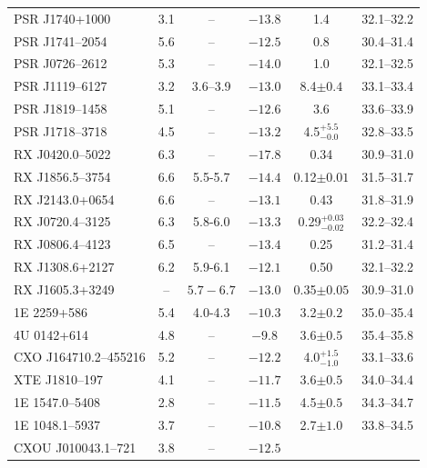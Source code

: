 \documentclass[smallextended]{svjour3}       %
\begin{document}
\begin{table}
\begin{center}
\begin{tabular}{l c c c c c }
        PSR J1740+1000       &  3.1  & -- & $ -13.8$ &      
            1.4 &   32.1--32.2 \\
        PSR J1741--2054        & 5.6 & -- & $-12.5$ &   0.8 &
30.4--31.4 \\
        PSR J0726--2612       &  5.3  & -- & $-14.0$ &       
           1.0 &     32.1--32.5 \\
        PSR J1119--6127       &  3.2 & 3.6--3.9 & $-13.0$ &  
       8.4$\pm 0.4$ &    33.1--33.4 \\
        PSR J1819--1458       &  5.1 & -- & $-12.6$ &        
          3.6 &    33.6--33.9 \\
        PSR J1718--3718       & 4.5 & -- & $ -13.2$ & 4.5$^{+
5.5}_{- 0.0}$ &    32.8--33.5 \\
       RX J0420.0--5022        & 6.3 & -- & $ -17.8$ &       
          0.34 &    30.9--31.0 \\
       RX J1856.5--3754       & 6.6 & 5.5-5.7 & $ -14.4$ &   
     0.12$\pm0.01$ &    31.5--31.7 \\
       RX J2143.0+0654      &  6.6 & -- & $-13.1$ &         
        0.43 &    31.8--31.9 \\
       RX J0720.4--3125       & 6.3 & 5.8-6.0 & $ -13.3$
&0.29$^{+0.03}_{-0.02}$ &    32.2--32.4 \\
       RX J0806.4--4123       & 6.5 & -- & $ -13.4$ &        
         0.25 &  31.2--31.4 \\
       RX J1308.6+2127      & 6.2 & 5.9-6.1 & $ -12.1$ &    
             0.50 &   32.1--32.2 \\
       RX J1605.3+3249      &  -- & $ 5.7-6.7 $ & $-13.0$ & 
      0.35$\pm 0.05$ &   30.9--31.0 \\
           1E 2259+586         & 5.4 & 4.0-4.3 & $ -10.3$ & 
        3.2$\pm 0.2$ &    35.0--35.4 \\
           4U 0142+614         & 4.8 & -- & $  -9.8$ &      
   3.6$\pm 0.5$ &    35.4--35.8 \\
  CXO J164710.2--455216 & 5.2 & -- & $ -12.2$ & 4.0$^{+
1.5}_{- 1.0}$ &   33.1--33.6 \\
         XTE J1810--197        & 4.1 & -- & $ -11.7$ &       
  3.6$\pm 0.5$ &   34.0--34.4 \\
        1E 1547.0--5408        &  2.8 & -- & $-11.5$ &       
  4.5$\pm 0.5$ &     34.3--34.7 \\
        1E 1048.1--5937        &  3.7 & -- & $-10.8$ &       
  2.7$\pm 1.0$ &    33.8--34.5 \\
    CXOU J010043.1--721  &  3.8 & -- & $-12.5$ &        

\end{tabular}
\end{center}
\end{table}
\end{document}
